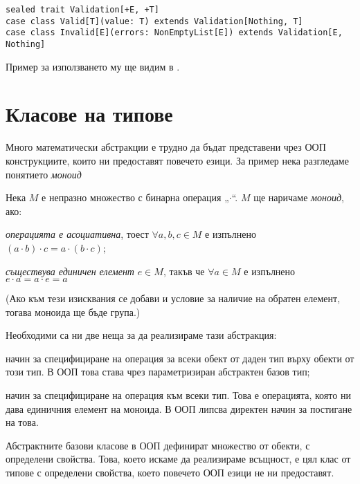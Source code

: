 \begin{lstlisting}
sealed trait Validation[+E, +T]
case class Valid[T](value: T) extends Validation[Nothing, T]
case class Invalid[E](errors: NonEmptyList[E]) extends Validation[E, Nothing]
\end{lstlisting}

Пример за използването му ще видим в .

\section{Класове на типове}
\label{sec:typeclasses}

Много математически абстракции е трудно да бъдат представени чрез ООП конструкциите, които ни предоставят повечето езици. За пример нека разгледаме понятието \emph{моноид}

\begin{definition}
  Нека $M$ е непразно множество с бинарна операция „$\cdot$“. $M$ ще наричаме \emph{моноид}, ако:
  
  \begin{itemize*}
    \item \emph{операцията е асоциативна}, тоест $\forall a, b, c \in M$ е изпълнено $(a \cdot b) \cdot c = a \cdot (b \cdot c)$;
    \item \emph{съществува единичен елемент} $e \in M$, такъв че $\forall a \in M$ е изпълнено $e \cdot a = a \cdot e = a$
  \end{itemize*}
\end{definition}

(Ако към тези изисквания се добави и условие за наличие на обратен елемент, тогава моноида ще бъде група.)

Необходими са ни две неща за да реализираме тази абстракция:

\begin{itemize*}
  \item начин за специфициране на операция за всеки обект от даден тип върху обекти от този тип. В ООП това става чрез параметризиран абстрактен базов тип;
  \item начин за специфициране на операция към всеки тип. Това е операцията, която ни дава единичния елемент на моноида. В ООП липсва директен начин за постигане на това. 
\end{itemize*}

Абстрактните базови класове в ООП дефинират множество от обекти, с определени свойства. Това, което искаме да реализираме всъщност, е цял клас от типове с определени свойства, което повечето ООП езици не ни предоставят.


